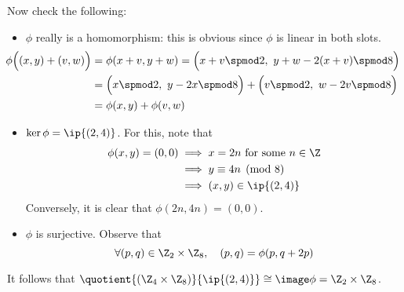 \begin{enumerate}
\begin{enumerate}
	Now check the following:
	\begin{itemize}
	  \item $\phi$ really is a homomorphism: this is obvious since $\phi$ is linear in both slots.
	  \begin{align*}
	  \hspace*{-21pt}\phi\Bigl((x,y)+(v,w)\Bigr)&=\phi(x+v,y+w)=\Bigl(x+v\spmod 2,\ y+w-2(x+v)\spmod 8\Bigr)\\
	  &=\Bigl(x\spmod 2,\ y-2x\spmod 8\Bigr)+\Bigl(v\spmod 2,\ w-2v\spmod 8\Bigr)\\
	  &=\phi(x,y)+\phi(v,w)
	  \end{align*}
	  \item $\ker\phi=\ip{(2,4)}$. For this, note that
	  \begin{align*}
	  \phi(x,y)=(0,0)&\implies x=2n\ \text{for some $n\in\Z$}\\
	  &\implies y\equiv 4n\pmod 8\\
	  &\implies (x,y)\in\ip{(2,4)}
	  \end{align*}
	  Conversely, it is clear that $\phi(2n,4n)=(0,0)$.
	  \item $\phi$ is surjective. Observe that
	  \[\forall (p,q)\in\Z_2\times\Z_8,\quad (p,q)=\phi(p,q+2p)\]
	\end{itemize}
 It follows that $\quotient{(\Z_4\times\Z_8)}{\ip{(2,4)}}\cong\image\phi=\Z_2\times\Z_8$.
\end{enumerate}\pagebreak[2]


\end{enumerate}
